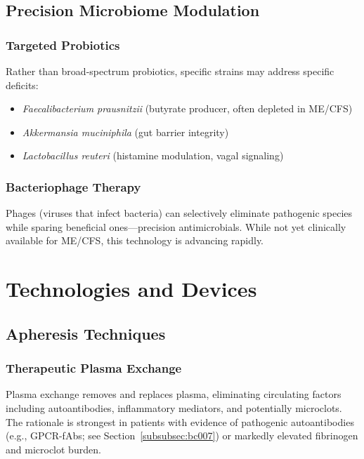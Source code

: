 \subsection{Precision Microbiome Modulation}

\subsubsection{Targeted Probiotics}

Rather than broad-spectrum probiotics, specific strains may address specific deficits:
\begin{itemize}
    \item \textit{Faecalibacterium prausnitzii} (butyrate producer, often depleted in ME/CFS)
    \item \textit{Akkermansia muciniphila} (gut barrier integrity)
    \item \textit{Lactobacillus reuteri} (histamine modulation, vagal signaling)
\end{itemize}

\subsubsection{Bacteriophage Therapy}

Phages (viruses that infect bacteria) can selectively eliminate pathogenic species while sparing beneficial ones---precision antimicrobials. While not yet clinically available for ME/CFS, this technology is advancing rapidly.

\section{Technologies and Devices}
\label{sec:technologies}

\subsection{Apheresis Techniques}

\subsubsection{Therapeutic Plasma Exchange}

Plasma exchange removes and replaces plasma, eliminating circulating factors including autoantibodies, inflammatory mediators, and potentially microclots. The rationale is strongest in patients with evidence of pathogenic autoantibodies (e.g., GPCR-fAbs; see Section~\ref{subsubsec:bc007}) or markedly elevated fibrinogen and microclot burden.

